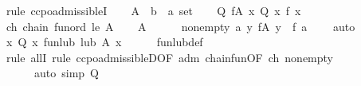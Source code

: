 \begin{isabellebody}
\isamarkupfalse%
\ {\isacharparenleft}{\kern0pt}rule\ ccpo{\isachardot}{\kern0pt}admissibleI{\isacharparenright}{\kern0pt}\isanewline
\ \ \isamarkupfalse%
\ A\ {\isacharcolon}{\kern0pt}{\isacharcolon}{\kern0pt}\ {\isachardoublequoteopen}{\isacharparenleft}{\kern0pt}{\isacharprime}{\kern0pt}b\ {\isasymRightarrow}\ {\isacharprime}{\kern0pt}a{\isacharparenright}{\kern0pt}\ set{\isachardoublequoteclose}\isanewline
\ \ \isamarkupfalse%
\ Q{\isacharcolon}{\kern0pt}\ {\isachardoublequoteopen}{\isasymforall}f{\isasymin}A{\isachardot}{\kern0pt}\ {\isasymforall}x{\isachardot}{\kern0pt}\ Q\ x\ {\isacharparenleft}{\kern0pt}f\ x{\isacharparenright}{\kern0pt}{\isachardoublequoteclose}\isanewline
\ \ \isamarkupfalse%
\ ch{\isacharcolon}{\kern0pt}\ {\isachardoublequoteopen}chain\ {\isacharparenleft}{\kern0pt}fun{\isacharunderscore}{\kern0pt}ord\ le{\isacharparenright}{\kern0pt}\ A{\isachardoublequoteclose}\isanewline
\ \ \isamarkupfalse%
\ {\isachardoublequoteopen}A\ {\isasymnoteq}\ {\isacharbraceleft}{\kern0pt}{\isacharbraceright}{\kern0pt}{\isachardoublequoteclose}\isanewline
\ \ \isamarkupfalse%
\ non{\isacharunderscore}{\kern0pt}empty{\isacharcolon}{\kern0pt}\ {\isachardoublequoteopen}{\isasymAnd}a{\isachardot}{\kern0pt}\ {\isacharbraceleft}{\kern0pt}y{\isachardot}{\kern0pt}\ {\isasymexists}f{\isasymin}A{\isachardot}{\kern0pt}\ y\ {\isacharequal}{\kern0pt}\ f\ a{\isacharbraceright}{\kern0pt}\ {\isasymnoteq}\ {\isacharbraceleft}{\kern0pt}{\isacharbraceright}{\kern0pt}{\isachardoublequoteclose}\ \isamarkupfalse%
\ auto\isanewline
\ \ \isamarkupfalse%
\ {\isachardoublequoteopen}{\isasymforall}x{\isachardot}{\kern0pt}\ Q\ x\ {\isacharparenleft}{\kern0pt}fun{\isacharunderscore}{\kern0pt}lub\ lub\ A\ x{\isacharparenright}{\kern0pt}{\isachardoublequoteclose}\isanewline
\ \ \ \ \isamarkupfalse%
\ fun{\isacharunderscore}{\kern0pt}lub{\isacharunderscore}{\kern0pt}def\isanewline
\ \ \ \ \isamarkupfalse%
\ {\isacharparenleft}{\kern0pt}rule\ allI{\isacharcomma}{\kern0pt}\ rule\ ccpo{\isachardot}{\kern0pt}admissibleD{\isacharbrackleft}{\kern0pt}OF\ adm\ chain{\isacharunderscore}{\kern0pt}fun{\isacharbrackleft}{\kern0pt}OF\ ch{\isacharbrackright}{\kern0pt}\ non{\isacharunderscore}{\kern0pt}empty{\isacharbrackright}{\kern0pt}{\isacharparenright}{\kern0pt}\isanewline
\ \ \ \ \ \ {\isacharparenleft}{\kern0pt}auto\ simp{\isacharcolon}{\kern0pt}\ Q{\isacharparenright}{\kern0pt}\isanewline
{}\isamarkupfalse%

\end{isabellebody}
